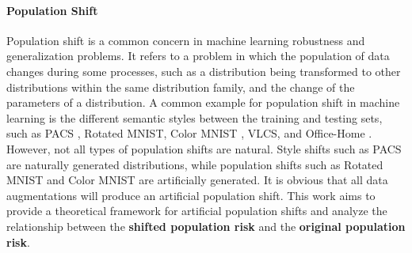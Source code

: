\paragraph{Population Shift}
Population shift is a common concern in machine learning robustness and generalization problems. It refers to a problem in which the population of data changes during some processes, such as a distribution being transformed to other distributions within the same distribution family, and the change of the parameters of a distribution. A common example for population shift in machine learning is the different semantic styles between the training and testing sets, such as PACS \cite{li2017deeper}, Rotated MNIST, Color MNIST \cite{arjovsky2019invariant}, VLCS, and Office-Home \cite{venkateswara2017deep}. However, not all types of population shifts are natural. Style shifts such as PACS are naturally generated distributions, while population shifts such as Rotated MNIST and Color MNIST are artificially generated. It is obvious that all data augmentations will produce an artificial population shift. This work aims to provide a theoretical framework for artificial population shifts and analyze the relationship between the \textbf{shifted population risk} and the \textbf{original population risk}.